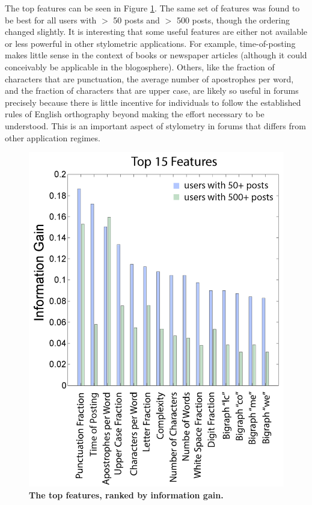 \documentclass[12pt,letterpaper,onecolumn,oneside]{article}
\numberwithin{equation}{section}
\numberwithin{figure}{section}
\begin{document}
The top features can be seen in Figure \ref{infogain}. The same set of features was found to be best for all users with \(>\) 50 posts and \(>\) 500 posts, though the ordering changed slightly. It is 
interesting that some useful features are either not available or less powerful in other stylometric applications. For example, time-of-posting makes little sense in the context of books or newspaper articles 
(although it could conceivably be applicable in the blogosphere). Others, like the fraction of characters that are punctuation, the average number of apostrophes per word, and the fraction of characters that are upper 
case, are likely so useful in forums precisely because there is little incentive for individuals to follow the established rules of English orthography beyond making the effort necessary to be understood. This is an 
important aspect of stylometry in forums that differs from other application regimes.

\begin{figure}[H]
 \centering
  \includegraphics[scale=0.4]{TopFeatures.png}
  \caption{\textbf{\footnotesize{The top features, ranked by information gain.}}}
  \label{infogain}
\end{figure}
\end{document}
